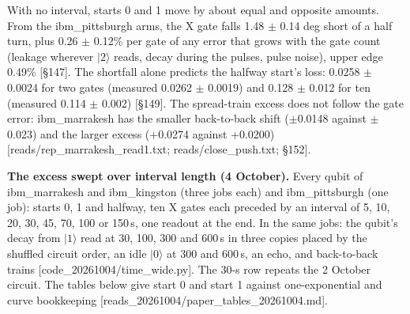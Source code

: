\documentclass[11pt]{article}
\begin{document}
\par\smallskip\noindent{}\par\smallskip
With no interval, starts 0 and 1 move by about equal and opposite amounts. From the ibm\_pittsburgh arms, the X gate falls 1.48 \(\pm\) 0.14 deg short of a half turn, plus 0.26 \(\pm\) 0.12\% per gate of any error that grows with the gate count (leakage wherever \(|2\rangle\) reads, decay during the pulses, pulse noise), upper edge 0.49\% {[}\S{}147{]}. The shortfall alone predicts the halfway start's loss: 0.0258 \(\pm\) 0.0024 for two gates (measured 0.0262 \(\pm\) 0.0019) and 0.128 \(\pm\) 0.012 for ten (measured 0.114 \(\pm\) 0.002) {[}\S{}149{]}. The spread-train excess does not follow the gate error: ibm\_marrakesh has the smaller back-to-back shift (\(\pm\)0.0148 against \(\pm\)0.023) and the larger excess (+0.0274 against +0.0200) {[}reads/rep\_marrakesh\_read1.txt; reads/close\_push.txt; \S{}152{]}.

\textbf{The excess swept over interval length (4 October).} Every qubit of ibm\_marrakesh and ibm\_kingston (three jobs each) and ibm\_pittsburgh (one job): starts 0, 1 and halfway, ten X gates each preceded by an interval of 5, 10, 20, 30, 45, 70, 100 or 150\,\textmu s, one readout at the end. In the same jobs: the qubit's decay from \(|1\rangle\) read at 30, 100, 300 and 600\,\textmu s in three copies placed by the shuffled circuit order, an idle \(|0\rangle\) at 300 and 600\,\textmu s, an echo, and back-to-back trains {[}code\_20261004/time\_wide.py{]}. The 30-\textmu s row repeats the 2 October circuit. The tables below give start 0 and start 1 against one-exponential and curve bookkeeping {[}reads\_20261004/paper\_tables\_20261004.md{]}.
\end{document}
